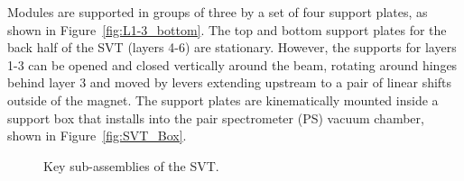 \documentclass[12pt]{report}
\begin{document}
Modules are supported in groups of three by a set of four support plates, as shown in Figure~\ref{fig:L1-3_bottom}. The top and bottom support plates for the back half of the SVT (layers 4-6) are stationary.  However, the supports for layers 1-3 can be opened and closed vertically around the beam, rotating around hinges behind layer 3 and moved by levers extending upstream to a pair of linear shifts outside of the magnet. The support plates are kinematically mounted inside a support box that installs into the pair spectrometer (PS) vacuum chamber, shown in Figure~\ref{fig:SVT_Box}.
\begin{figure}[htpb]
\hspace{0.5cm}
\caption{Key sub-assemblies of the SVT.}
\end{figure}
\end{document}
